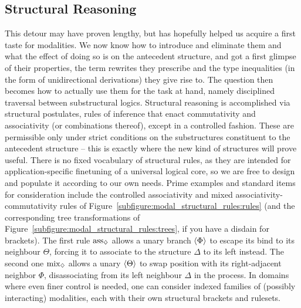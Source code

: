 \subsection{Structural Reasoning}
This detour may have proven lengthy, but has hopefully helped us acquire a first taste for modalities.
We now know how to introduce and eliminate them and what the effect of doing so is on the antecedent structure, and got a first glimpse of their properties, the term rewrites they prescribe and the type inequalities (in the form of unidirectional derivations) they give rise to.
The question then becomes how to actually use them for the task at hand, namely disciplined traversal between substructural logics.
Structural reasoning is accomplished via structural postulates, rules of inference that enact commutativity and associativity (or combinations thereof), except in a controlled fashion.
These are permissible only under strict conditions on the substructures constituent to the antecedent structure -- this is exactly where the new kind of structures will prove useful.
There is no fixed vocabulary of structural rules, as they are intended for application-specific finetuning of a universal logical core, so we are free to design and populate it according to our own needs.
Prime examples and standard items for consideration include the controlled associativity and mixed associativity-commutativity rules of Figure~\ref{subfigure:modal_structural_rules:rules} (and the corresponding tree transformations of Figure~\ref{subfigure:modal_structural_rules:trees}, if you have a disdain for brackets).
The first rule $\rulestyle{ass}_{\diamond}$ allows a unary branch $\langle{\Phi}\rangle$ to escape its bind to its neighbour $\Theta$, forcing it to associate to the structure $\Delta$ to its left instead.
The second one $\rulestyle{mix}_{\diamond}$ allows a unary $\langle{\Theta}\rangle$ to swap position with its right-adjacent neighbor $\Phi$, disassociating from its left neighbour $\Delta$ in the process.
In domains where even finer control is needed, one can consider indexed families of (possibly interacting) modalities, each with their own structural brackets and rulesets.

